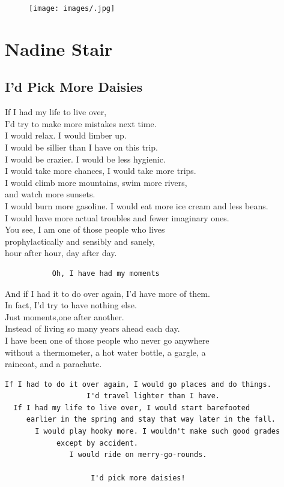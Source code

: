 \documentclass[]{book}
\renewenvironment{quote}{\begin{VF}}{\end{VF}}
\begin{document}
\begin{figure}[htbp]
\centering
\texttt{[image: images/.jpg]}
\caption{}
\end{figure}

\chapter{Nadine Stair}\label{nadine-stair}

\section{I'd Pick More Daisies}\label{id-pick-more-daisies}

\begin{quote}
If I had my life to live over,\\
I'd try to make more mistakes next time.\\
I would relax. I would limber up.\\
I would be sillier than I have on this trip.\\
I would be crazier. I would be less hygienic.\\
I would take more chances, I would take more trips.\\
I would climb more mountains, swim more rivers,\\
and watch more sunsets.\\
I would burn more gasoline. I would eat more ice cream and less beans.\\
I would have more actual troubles and fewer imaginary ones.\\
You see, I am one of those people who lives\\
prophylactically and sensibly and sanely,\\
hour after hour, day after day.

\begin{verbatim}
           Oh, I have had my moments  
\end{verbatim}

And if I had it to do over again, I'd have more of them.\\
In fact, I'd try to have nothing else.\\
Just moments,one after another.\\
Instead of living so many years ahead each day.\\
I have been one of those people who never go anywhere\\
without a thermometer, a hot water bottle, a gargle, a\\
raincoat, and a parachute.

\begin{verbatim}
If I had to do it over again, I would go places and do things.  
                   I'd travel lighter than I have.  
  If I had my life to live over, I would start barefooted  
     earlier in the spring and stay that way later in the fall.  
       I would play hooky more. I wouldn't make such good grades  
            except by accident.  
               I would ride on merry-go-rounds.  

                    I'd pick more daisies!  
\end{verbatim}
\end{quote}
\end{document}
